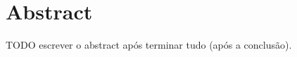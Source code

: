 \documentclass[12pt,twoside,openright]{report}
\begin{document}
\chapter*{Abstract}
TODO escrever o abstract após terminar tudo (após a conclusão).\\

\tableofcontents
{}

















\appendix




\printbibliography
\end{document}

